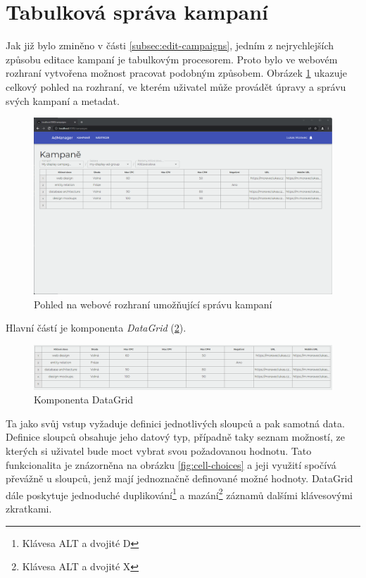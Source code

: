 \section{Tabulková správa kampaní}
Jak již bylo zminěno v části \ref{subsec:edit-campaigns}, jedním z nejrychlejších způsobu editace kampaní je tabulkovým procesorem.
Proto bylo ve webovém rozhraní vytvořena možnost pracovat podobným způsobem. Obrázek \ref{fig:datagrid-window} ukazuje celkový pohled na rozhraní, ve kterém uživatel
může provádět úpravy a správu svých kampaní a metadat.
\begin{figure}[h]
    \centering
    \includegraphics[width=1\textwidth]{Figures/ui/whole-window.png}
    \caption{Pohled na webové rozhraní umožňující správu kampaní}
    \label{fig:datagrid-window}
\end{figure}
Hlavní částí je komponenta \emph{DataGrid} (\ref{fig:datagrid}).
\begin{figure}[h]
    \centering
    \includegraphics[width=1\textwidth]{Figures/ui/datagrid.png}
    \caption{Komponenta DataGrid}
    \label{fig:datagrid}
\end{figure}
Ta jako svůj vstup vyžaduje definici jednotlivých sloupců
a pak samotná data. Definice sloupců obsahuje jeho datový typ, případně taky seznam možností, ze kterých si uživatel bude moct vybrat svou požadovanou hodnotu.
Tato funkcionalita je znázorněna na obrázku \ref{fig:cell-choices} a jeji využití spočívá převážně u sloupců, jenž mají jednoznačně definované možné hodnoty. DataGrid
dále poskytuje jednoduché duplikování\footnote{Klávesa ALT a dvojité D} a mazání\footnote{Klávesa ALT a dvojité X} záznamů dalšími klávesovými zkratkami. 

